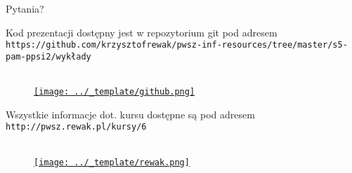 \appendix

\begin{frame}[standout]
	Pytania?
\end{frame}

\begin{frame}{}

	Kod prezentacji dostępny jest w repozytorium git pod adresem \texttt{https://github.com/krzysztofrewak/pwsz-inf-resources/tree/master/s5-pam-ppsi2/wykłady} \\ \ \\

	\begin{figure}
		\centering
		\href{https://github.com/krzysztofrewak/pwsz-inf-resources}{
			\texttt{[image: ../\_template/github.png]}
		}
	\end{figure}
	
	Wszystkie informacje dot. kursu dostępne są pod adresem \texttt{http://pwsz.rewak.pl/kursy/6} \\ \ \\

	\begin{figure}
		\centering
		\href{http://pwsz.rewak.pl/kursy/3}{
			\texttt{[image: ../\_template/rewak.png]}
		}
	\end{figure}

\end{frame}


